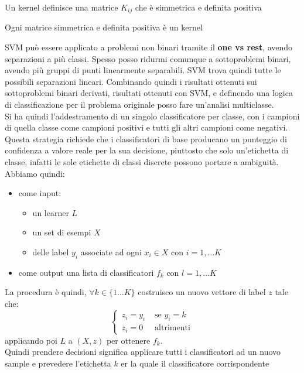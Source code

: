 \documentclass[a4paper,12pt, oneside]{book}
\begin{document}
\begin{teorema}
  Un kernel definisce una matrice $K_{ij}$ che è simmetrica e definita positiva
\end{teorema}
\begin{teorema}
  Ogni matrice simmetrica e definita positiva è un kernel
\end{teorema}
SVM può essere applicato a problemi non binari tramite il \textbf{one vs rest},
avendo separazioni a più classi. Spesso posso ridurmi comunque a sottoproblemi
binari, avendo più gruppi di punti linearmente separabili. SVM trova quindi
tutte le possibili separazioni lineari. Combinando quindi i risultati ottenuti
sui sottoproblemi binari derivati, risultati ottenuti con SVM, e definendo una
logica di classificazione per il problema originale posso fare un'analisi
multiclasse.\\
Si ha quindi l'addestramento di un singolo classificatore per classe, con i
campioni di quella classe come campioni positivi e tutti gli altri campioni come
negativi.\\
Questa strategia richiede che i classificatori di base producano un punteggio di
confidenza a valore reale per la sua decisione, piuttosto che solo un'etichetta
di classe, infatti le sole etichette di classi discrete possono portare a
ambiguità.\\
Abbiamo quindi:
\begin{itemize}
  \item come input:
  \begin{itemize}
    \item un learner $L$
    \item un set di esempi $X$
    \item delle label $y_i$ associate ad ogni $x_i\in X$ con $i=1,\ldots K$
  \end{itemize}
  \item come output una lista di classificatori $f_k$ con $l=1,\ldots K$
\end{itemize}
La procedura è quindi, $\forall k\in \{1\ldots K\}$ costruisco un nuovo vettore
di label $z$ tale che:
\[
  \begin{cases}
    z_i=y_i&\mbox{ se } y_i=k\\
    z_i=0&\mbox{ altrimenti}
  \end{cases}
\]
applicando poi $L$ a $(X,z)$ per ottenere $f_k$.\\
Quindi prendere decisioni significa applicare tutti i classificatori ad un nuovo
sample e prevedere l'etichetta $k$ er la quale il classificatore corrispondente
\end{document}
